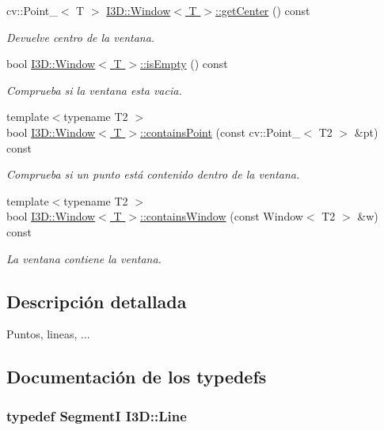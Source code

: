 \begin{DoxyCompactItemize}
cv\+::\+Point\+\_\+$<$ T $>$ \hyperlink{group___geometric_entities_gacddf95309d8471ebffc0c51ce4fa9055}{I3\+D\+::\+Window$<$ T $>$\+::get\+Center} () const 
\begin{DoxyCompactList}\small\item\em Devuelve centro de la ventana. \end{DoxyCompactList}\item 
bool \hyperlink{group___geometric_entities_ga538a75457375309a2a519a8b40185bf3}{I3\+D\+::\+Window$<$ T $>$\+::is\+Empty} () const 
\begin{DoxyCompactList}\small\item\em Comprueba si la ventana esta vacia. \end{DoxyCompactList}\item 
{\footnotesize template$<$typename T2 $>$ }\\bool \hyperlink{group___geometric_entities_gadedaaec93c260131acb5bf30b2e14dda}{I3\+D\+::\+Window$<$ T $>$\+::contains\+Point} (const cv\+::\+Point\+\_\+$<$ T2 $>$ \&pt) const 
\begin{DoxyCompactList}\small\item\em Comprueba si un punto está contenido dentro de la ventana. \end{DoxyCompactList}\item 
{\footnotesize template$<$typename T2 $>$ }\\bool \hyperlink{group___geometric_entities_ga39b646714c642da0cce15bfe311d1d5c}{I3\+D\+::\+Window$<$ T $>$\+::contains\+Window} (const Window$<$ T2 $>$ \&w) const 
\begin{DoxyCompactList}\small\item\em La ventana contiene la ventana. \end{DoxyCompactList}\end{DoxyCompactItemize}


\subsection{Descripción detallada}
Puntos, lineas, ... 

\subsection{Documentación de los \textquotesingle{}typedefs\textquotesingle{}}
\subsubsection[{\texorpdfstring{Line}{Line}}]{\setlength{\rightskip}{0pt plus 5cm}typedef SegmentI {\bf I3\+D\+::\+Line}}\hypertarget{group___geometric_entities_ga483b43891a1b33d99406fdc397e9a445}{}\label{group___geometric_entities_ga483b43891a1b33d99406fdc397e9a445}
